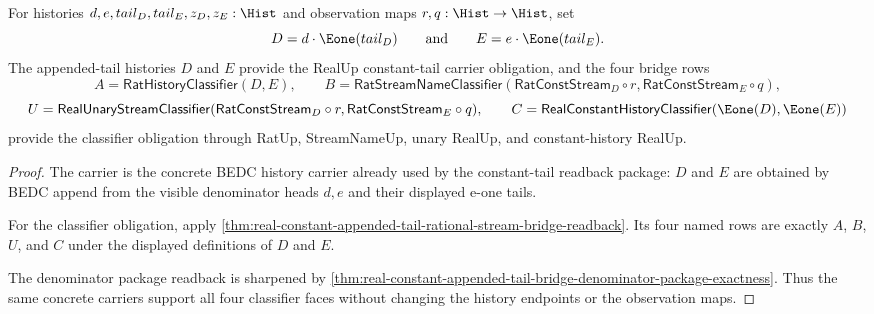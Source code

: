 \begin{theorem}
\label{thm:real-constant-tail-obligation-carrier-classifier}
For histories $d,e,tail_D,tail_E,z_D,z_E:\Hist$ and observation maps
$r,q:\Hist\to\Hist$, set
$$
D=d\cdot\Eone(tail_D)
\qquad\text{and}\qquad
E=e\cdot\Eone(tail_E).
$$
The appended-tail histories $D$ and $E$ provide the RealUp constant-tail
carrier obligation, and the four bridge rows
$$
A=\mathsf{RatHistoryClassifier}(D,E),
\qquad
B=\mathsf{RatStreamNameClassifier}(\mathsf{RatConstStream}_D\circ r,
\mathsf{RatConstStream}_E\circ q),
$$
$$
U=\mathsf{RealUnaryStreamClassifier}(\mathsf{RatConstStream}_D\circ r,
\mathsf{RatConstStream}_E\circ q),
\qquad
C=\mathsf{RealConstantHistoryClassifier}(\Eone(D),\Eone(E))
$$
provide the classifier obligation through RatUp, StreamNameUp, unary RealUp,
and constant-history RealUp.
\end{theorem}
\begin{proof}
The carrier is the concrete BEDC history carrier already used by the
constant-tail readback package: $D$ and $E$ are obtained by BEDC append from
the visible denominator heads $d,e$ and their displayed e-one tails.

For the classifier obligation, apply
\autoref{thm:real-constant-appended-tail-rational-stream-bridge-readback}.
Its four named rows are exactly $A$, $B$, $U$, and $C$ under the displayed
definitions of $D$ and $E$.

The denominator package readback is sharpened by
\autoref{thm:real-constant-appended-tail-bridge-denominator-package-exactness}.
Thus the same concrete carriers support all four classifier faces without
changing the history endpoints or the observation maps.
\end{proof}

